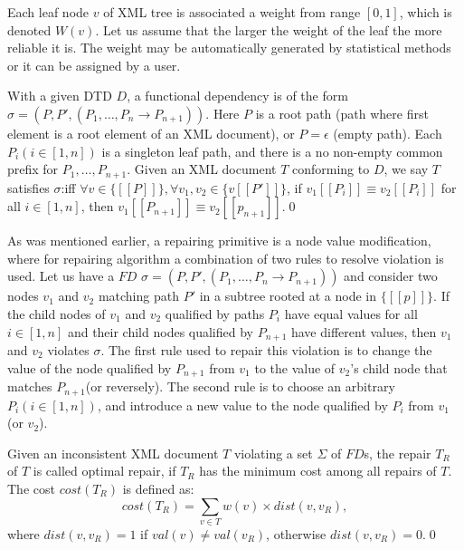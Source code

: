 Each leaf node $v$ of XML tree is associated a weight from range $[0,1]$, which is denoted $W(v)$. Let us assume that the larger the weight of the leaf the more reliable it is. The weight may be automatically generated by statistical methods or it can be assigned by a user.

\begin{define}
With a given DTD $D$, a functional dependency is of the form $\sigma = (P, P', (P_1, \dots, P_n \rightarrow P_{n+1}))$. Here $P$ is a  root path (path where first element is a root element of an XML document), or $P = \epsilon$ (empty path). Each $P_i (i \in [1,n])$ is a singleton leaf path, and there is a no non-empty common prefix for $P_1, \dots, P_{n+1}$. Given an XML document $T$ conforming to $D$, we say $T$ satisfies $\sigma$:iff $\forall v \in \{[\![P]\!]\}, \forall v_1, v_2 \in \{v[\![P']\!]\}$, if $v_1[\![P_i]\!] \equiv v_2[\![P_i]\!]$ for all $i \in [1,n]$, then $v_1[\![P_{n+1}]\!] \equiv v_2[\![p_{n+1}]\!]$.\qed
\end{define}

As was mentioned earlier, a repairing primitive is a node value modification, where for repairing algorithm a combination of two rules to resolve violation is used. Let us have a $FD$ $\sigma = (P, P', (P_1, \dots, P_n \rightarrow P_{n+1}))$ and consider two nodes $v_1$ and $v_2$ matching path $P'$ in a subtree rooted at a node in $\{[\![p]\!]\}$. If the child nodes of $v_1$ and $v_2$ qualified by paths $P_i$ have equal values for all $i \in [1,n]$ and their child nodes qualified by $P_{n+1}$ have different values, then $v_1$ and $v_2$ violates $\sigma$. The first rule used to repair this violation is to change the value of the node qualified by $P_{n+1}$ from $v_1$ to the value of $v_2$'s child node that matches $P_{n+1}$(or reversely). The second rule is to choose an arbitrary $P_i (i \in [1,n])$, and introduce a new value to the node qualified by $P_i$ from $v_1$ (or $v_2$).

\begin{define}
Given an inconsistent XML document $T$ violating a set $\Sigma$ of $FD$s, the repair $T_R$ of $T$ is called optimal repair, if $T_R$ has the minimum cost among all repairs of $T$. The cost $cost(T_R)$ is defined as:
\begin{displaymath}
cost(T_R) = \sum_{v \in T} w(v) \times dist(v, v_R),
\end{displaymath}
where $dist(v, v_R)=1$ if $val(v) \neq val(v_R)$, otherwise $dist(v, v_R)=0$.\qed
\end{define}

